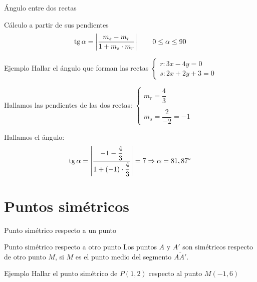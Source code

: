 \documentclass[8pt]{beamer}
\begin{document}
\begin{frame}[t]{Ángulo entre dos rectas}

\begin{alertblock}{Cálculo a partir de sus pendientes}
\[ \mathop{\rm tg}\nolimits \alpha = \left| \dfrac{m_s - m_r}{1+m_s \cdot m_r }\right| \qquad 0 \leq \alpha \leq 90 \]
\end{alertblock}
\pause
\begin{exampleblock}{Ejemplo}
Hallar el ángulo que forman las rectas $\begin{cases} r: 3x-4y=0 \\ s: 2x+2y+3=0 \end{cases}$
\end{exampleblock}
\pause
Hallamos las pendientes de las dos rectas: $\begin{cases} m_r= \dfrac{4}{3} \\ \\ m_s=\dfrac{2}{-2}=-1 \end{cases}$
\pause

Hallamos el ángulo:
\pause
\[ \mathop{\rm tg}\nolimits \alpha =\left| \dfrac{-1-\dfrac{4}{3}}{1+(-1)\cdot \dfrac{4}{3}} \right|= 7  \Rightarrow \alpha = 81,87 {}^\circ \]

\end{frame}

\section{Puntos simétricos}
\begin{frame}[t]{Punto simétrico respecto a un punto}
\begin{alertblock}{Punto simétrico respecto a otro punto}
Los puntos $A$ y $A'$ son simétricos respecto de otro punto $M$, si $M$ es el punto medio del segmento $\overline{AA'}$.
\end{alertblock}

\pause

\begin{exampleblock}{Ejemplo}
Hallar el punto simétrico de $P(1,2)$ respecto al punto $M(-1,6)$
\end{exampleblock}
\end{frame}
\end{document}
